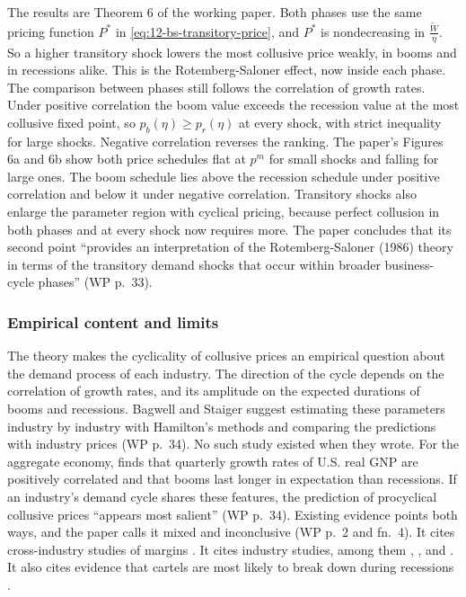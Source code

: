 The results are Theorem 6 of the working paper. Both phases use the same pricing function $P^*$ in
\eqref{eq:12-bs-transitory-price}, and $P^*$ is nondecreasing in $\frac{\tilde W}{\eta}$. So a higher transitory shock lowers the
most collusive price weakly, in booms and in recessions alike. This is the Rotemberg-Saloner effect, now inside each
phase. The comparison between phases still follows the correlation of growth rates. Under positive correlation the
boom value exceeds the recession value at the most collusive fixed point, so $p_b(\eta) \ge p_r(\eta)$ at every shock,
with strict inequality for large shocks. Negative correlation reverses the ranking. The paper's Figures 6a and 6b show
both price schedules flat at $p^m$ for small shocks and falling for large ones. The boom schedule lies above the
recession schedule under positive correlation and below it under negative correlation. Transitory shocks also enlarge
the parameter region with cyclical pricing, because perfect collusion in both phases and at every shock now requires
more. The paper concludes that its second point ``provides an interpretation of the Rotemberg-Saloner (1986) theory in
terms of the transitory demand shocks that occur within broader business-cycle phases'' (WP p.~33).

\subsubsection{Empirical content and limits}

The theory makes the cyclicality of collusive prices an empirical question about the demand process of each industry.
The direction of the cycle depends on the correlation of growth rates, and its amplitude on the expected durations of
booms and recessions. Bagwell and Staiger suggest estimating these parameters industry by industry with Hamilton's
methods and comparing the predictions with industry prices (WP p.~34). No such study existed when they wrote. For
the aggregate economy, \citet{Hamilton1989} finds that quarterly growth rates of U.S. real GNP are positively correlated
and that booms last longer in expectation than recessions. If an industry's demand cycle shares these features, the
prediction of procyclical collusive prices ``appears most salient'' (WP p.~34). Existing evidence points both ways,
and the paper calls it mixed and inconclusive (WP p.~2 and fn.~4). It cites cross-industry studies of margins
\citep{DomowitzHubbardPetersen1986,RotembergWoodford1992}. It cites industry studies, among them
\citet{BorensteinShepard1996}, \citet{Ellison1994}, \citet{Porter1983} and \citet{RotembergSaloner1986}. It also cites
evidence that cartels are most likely to break down during recessions \citep{Suslow1988}.

